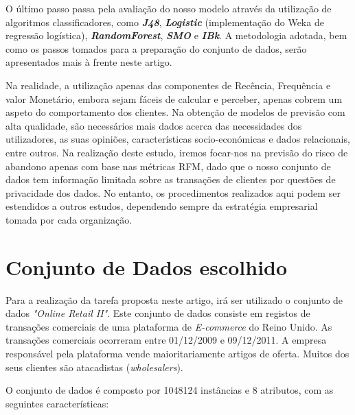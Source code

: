 \documentclass{easychair}
\begin{document}
O último passo passa pela avaliação do nosso modelo através da utilização de algoritmos classificadores, como \textbf{\textit{J48}}, \textbf{\textit{Logistic}} (implementação do Weka de regressão logística), \textbf{\textit{RandomForest}}, \textbf{\textit{SMO}} e \textbf{\textit{IBk}}. A metodologia adotada, bem como os passos tomados para a preparação do conjunto de dados, serão apresentados mais à frente neste artigo.

Na realidade, a utilização apenas das componentes de Recência, Frequência e valor Monetário, embora sejam fáceis de calcular e perceber, apenas cobrem um aspeto do comportamento dos clientes. Na obtenção de modelos de previsão com alta qualidade, são necessários mais dados acerca das necessidades dos utilizadores, as suas opiniões, características socio-económicas e dados relacionais, entre outros\cite{SGEM2008}. Na realização deste estudo, iremos focar-nos na previsão do risco de abandono apenas com base nas métricas RFM, dado que o nosso conjunto de dados tem informação limitada sobre as transações de clientes por questões de privacidade dos dados. No entanto, os procedimentos realizados aqui podem ser estendidos a outros estudos, dependendo sempre da estratégia empresarial tomada por cada organização.


\newpage


\section{Conjunto de Dados escolhido}

Para a realização da tarefa proposta neste artigo, irá ser utilizado o conjunto de dados \textit{"Online Retail II"}\cite{dataset}. Este conjunto de dados consiste em registos de transações comerciais de uma plataforma de \textit{E-commerce} do Reino Unido. As transações comerciais ocorreram entre 01/12/2009 e 09/12/2011. A empresa responsável pela plataforma vende maioritariamente artigos de oferta. Muitos dos seus clientes são atacadistas (\textit{wholesalers}).

O conjunto de dados é composto por 1048124 instâncias e 8 atributos, com as seguintes características:
\end{document}
